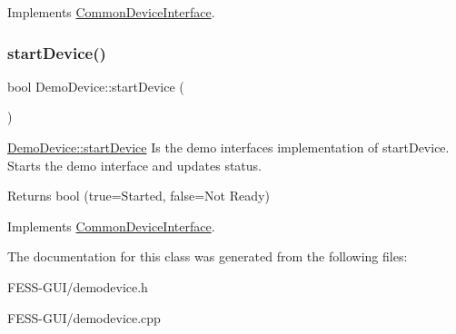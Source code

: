 Implements \hyperlink{class_common_device_interface}{Common\+Device\+Interface}.

\hypertarget{class_demo_device_af350ecf6ff289983cff9053197f1b1f2}{}\label{class_demo_device_af350ecf6ff289983cff9053197f1b1f2} 
\subsubsection{\texorpdfstring{start\+Device()}{startDevice()}}
{\footnotesize\ttfamily bool Demo\+Device\+::start\+Device (\begin{DoxyParamCaption}{ }\end{DoxyParamCaption})\hspace{0.3cm}{\ttfamily [virtual]}}



\hyperlink{class_demo_device_af350ecf6ff289983cff9053197f1b1f2}{Demo\+Device\+::start\+Device} Is the demo interface\textquotesingle{}s implementation of start\+Device. Starts the demo interface and updates status. 

\begin{DoxyReturn}{Returns}
bool (true=Started, false=Not Ready) 
\end{DoxyReturn}


Implements \hyperlink{class_common_device_interface}{Common\+Device\+Interface}.



The documentation for this class was generated from the following files\+:\begin{DoxyCompactItemize}
\item 
F\+E\+S\+S-\/\+G\+U\+I/demodevice.\+h\item 
F\+E\+S\+S-\/\+G\+U\+I/demodevice.\+cpp\end{DoxyCompactItemize}
